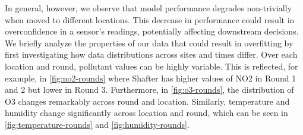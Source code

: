 \documentclass[journal abbreviation, manuscript]{copernicus}
\newcommand\todo[1]{\textcolor{red}{#1}}
\begin{document}
In general, however, we observe that model performance degrades non-trivially
when moved to different locations. This decrease in performance could result in overconfidence in a sensor's readings, potentially affecting downstream decisions. We briefly analyze the properties of our data that could result in overfitting
by first investigating how data distributions across sites and times differ. Over each location and round, pollutant values can be highly variable. This is reflected, for example, in \autoref{fig:no2-rounds} where Shafter has higher values of NO2 in Round 1 and 2 but lower in Round 3. Furthermore, in \autoref{fig:o3-rounds}, the distribution of O3 changes remarkably across round and location.
Similarly, temperature and humidity change significantly across location and round, which can be seen in \autoref{fig:temperature-rounds} and \autoref{fig:humidity-rounds}.

\end{document}
